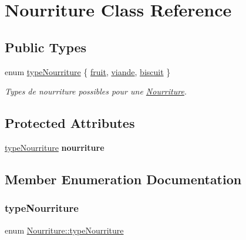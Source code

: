 \hypertarget{class_nourriture}{}\section{Nourriture Class Reference}
\label{class_nourriture}
\subsection*{Public Types}
\begin{DoxyCompactItemize}
\item 
enum \mbox{\hyperlink{class_nourriture_ab459ca0e14ce73ea116598d8f7f73ade}{type\+Nourriture}} \{ \mbox{\hyperlink{class_nourriture_ab459ca0e14ce73ea116598d8f7f73adea55a11f485ae353dd0a1dad83bb881aa1}{fruit}}, 
\mbox{\hyperlink{class_nourriture_ab459ca0e14ce73ea116598d8f7f73adea4def708f7fc976b086de13c2560e744e}{viande}}, 
\mbox{\hyperlink{class_nourriture_ab459ca0e14ce73ea116598d8f7f73adea6a49992e8ab135bd3c6fe993e7e8e72c}{biscuit}}
 \}
\begin{DoxyCompactList}\small\item\em Types de nourriture possibles pour une \mbox{\hyperlink{class_nourriture}{Nourriture}}. \end{DoxyCompactList}\end{DoxyCompactItemize}
\subsection*{Protected Attributes}
\begin{DoxyCompactItemize}
\item 
\mbox{\label{class_nourriture_a9581c456ba5e02ef4a26fb1cd144d755}} 
\mbox{\hyperlink{class_nourriture_ab459ca0e14ce73ea116598d8f7f73ade}{type\+Nourriture}} {\bfseries nourriture}
\end{DoxyCompactItemize}


\subsection{Member Enumeration Documentation}
\mbox{\label{class_nourriture_ab459ca0e14ce73ea116598d8f7f73ade}} 
\subsubsection{\texorpdfstring{type\+Nourriture}{typeNourriture}}
{\footnotesize\ttfamily enum \mbox{\hyperlink{class_nourriture_ab459ca0e14ce73ea116598d8f7f73ade}{Nourriture\+::type\+Nourriture}}}



